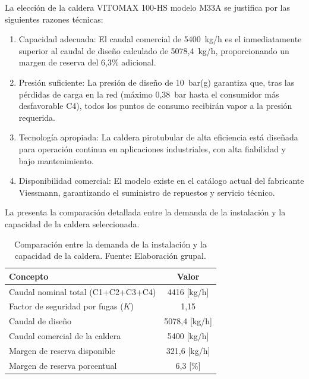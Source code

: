\documentclass[12pt]{article}
\begin{document}
La elección de la caldera VITOMAX 100-HS modelo M33A se justifica por las siguientes razones técnicas:

\begin{enumerate}[label=\arabic*., leftmargin=2em]
	\item Capacidad adecuada: El caudal comercial de 5400~kg/h es el inmediatamente superior al caudal de diseño calculado de 5078,4~kg/h, proporcionando un margen de reserva del 6,3\% adicional.
	\item Presión suficiente: La presión de diseño de 10~bar(g) garantiza que, tras las pérdidas de carga en la red (máximo 0,38~bar hasta el consumidor más desfavorable C4), todos los puntos de consumo recibirán vapor a la presión requerida.
	\item Tecnología apropiada: La caldera pirotubular de alta eficiencia está diseñada para operación continua en aplicaciones industriales, con alta fiabilidad y bajo mantenimiento.
	\item Disponibilidad comercial: El modelo existe en el catálogo actual del fabricante Viessmann, garantizando el suministro de repuestos y servicio técnico.
\end{enumerate}

La  presenta la comparación detallada entre la demanda de la instalación y la capacidad de la caldera seleccionada.

\begin{table}[H]
	\centering
	\caption{Comparación entre la demanda de la instalación y la capacidad de la caldera. Fuente: Elaboración grupal.}
	\label{tab:comparacion-demanda-caldera}
	\begin{tabular}{lc}
		\toprule
		\textbf{Concepto}                   & \textbf{Valor} \\
		\midrule
		Caudal nominal total (C1+C2+C3+C4)  & 4416 [kg/h]    \\
		Factor de seguridad por fugas ($K$) & 1,15           \\
		Caudal de diseño                    & 5078,4 [kg/h]  \\
		Caudal comercial de la caldera      & 5400 [kg/h]    \\
		Margen de reserva disponible        & 321,6 [kg/h]   \\
		Margen de reserva porcentual        & 6,3 [\%]       \\
		\bottomrule
	\end{tabular}
\end{table}
\end{document}
